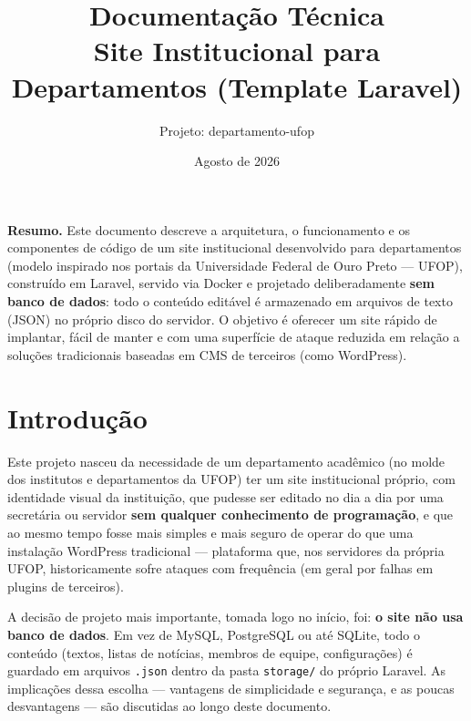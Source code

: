 \documentclass[11pt,a4paper]{article}
\title{
    \vspace{-2cm}
    {\Huge\bfseries\color{brandwine} Documentação Técnica}\\[0.3cm]
    {\Large Site Institucional para Departamentos (Template Laravel)}
}
\author{Projeto: departamento-ufop}
\date{Agosto de 2026}
\begin{document}
\maketitle
\thispagestyle{empty}

\vspace{1cm}
\begin{center}
\begin{minipage}{0.85\textwidth}
\small
\textbf{Resumo.} Este documento descreve a arquitetura, o funcionamento e os componentes de
código de um site institucional desenvolvido para departamentos (modelo inspirado nos portais
da Universidade Federal de Ouro Preto — UFOP), construído em Laravel, servido via Docker e
projetado deliberadamente \textbf{sem banco de dados}: todo o conteúdo editável é armazenado em
arquivos de texto (JSON) no próprio disco do servidor. O objetivo é oferecer um site rápido de
implantar, fácil de manter e com uma superfície de ataque reduzida em relação a soluções
tradicionais baseadas em CMS de terceiros (como WordPress).
\end{minipage}
\end{center}

\newpage
\tableofcontents
\newpage

\section{Introdução}

Este projeto nasceu da necessidade de um departamento acadêmico (no molde dos institutos e
departamentos da UFOP) ter um site institucional próprio, com identidade visual da instituição,
que pudesse ser editado no dia a dia por uma secretária ou servidor \textbf{sem qualquer
conhecimento de programação}, e que ao mesmo tempo fosse mais simples e mais seguro de operar
do que uma instalação WordPress tradicional — plataforma que, nos servidores da própria UFOP,
historicamente sofre ataques com frequência (em geral por falhas em plugins de terceiros).

A decisão de projeto mais importante, tomada logo no início, foi: \textbf{o site não usa banco
de dados}. Em vez de MySQL, PostgreSQL ou até SQLite, todo o conteúdo (textos, listas de
notícias, membros de equipe, configurações) é guardado em arquivos \texttt{.json} dentro da
pasta \texttt{storage/} do próprio Laravel. As implicações dessa escolha — vantagens de
simplicidade e segurança, e as poucas desvantagens — são discutidas ao longo deste documento.
\end{document}
